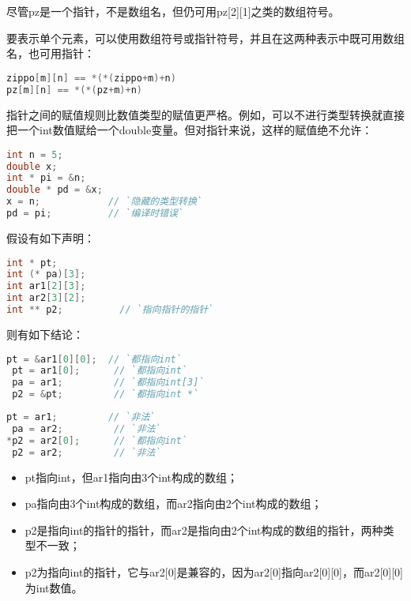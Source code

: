 \begin{frame}[fragile]
尽管{\tf pz}是一个指针，不是数组名，但仍可用{\tf pz[2][1]}之类的数组符号。\vspace{.1in}

要表示单个元素，可以使用数组符号或指针符号，并且在这两种表示中既可用数组名，也可用指针：
\begin{lstlisting}[language=c,backgroundcolor=\color{red!20}]
zippo[m][n] == *(*(zippo+m)+n)
pz[m][n] == *(*(pz+m)+n)
\end{lstlisting}
\end{frame}

\begin{frame}[fragile]
指针之间的赋值规则比数值类型的赋值更严格。例如，可以不进行类型转换就直接把一个{\tf int}数值赋给一个{\tf double}变量。但对指针来说，这样的赋值绝不允许：
\begin{lstlisting}[language=c,backgroundcolor=\color{red!20}]
int n = 5;
double x;
int * pi = &n;
double * pd = &x;
x = n;            // `隐藏的类型转换`
pd = pi;          // `编译时错误`
\end{lstlisting}
\end{frame}

\begin{frame}[fragile]
假设有如下声明：
\begin{lstlisting}[language=c,backgroundcolor=\color{red!20}]
int * pt;
int (* pa)[3];
int ar1[2][3];
int ar2[3][2];
int ** p2;          // `指向指针的指针`
\end{lstlisting}
则有如下结论：
\begin{lstlisting}[language=c,backgroundcolor=\color{red!20}]
 pt = &ar1[0][0];  // `都指向int`
 pt = ar1[0];      // `都指向int`
 pa = ar1;         // `都指向int[3]`
 p2 = &pt;         // `都指向int *`
\end{lstlisting}
\end{frame}

\begin{frame}[fragile]
\begin{lstlisting}[language=c,backgroundcolor=\color{red!20}]
 pt = ar1;         // `非法`
 pa = ar2;         // `非法`
*p2 = ar2[0];      // `都指向int` 
 p2 = ar2;         // `非法`
\end{lstlisting}
\begin{itemize}
\item
{\tf pt}指向{\tf int}，但{\tf ar1}指向由3个{\tf int}构成的数组；
\item
{\tf pa}指向由3个{\tf int}构成的数组，而{\tf ar2}指向由2个{\tf int}构成的数组；
\item
{\tf p2}是指向{\tf int}的指针的指针，而{\tf ar2}是指向由2个{\tf int}构成的数组的指针，两种类型不一致；
\item
{\tf *p2}为指向{\tf int}的指针，它与{\tf ar2[0]}是兼容的，因为{\tf ar2[0]}指向{\tf ar2[0][0]}，而{\tf ar2[0][0]}为{\tf int}数值。
\end{itemize}
\end{frame}

